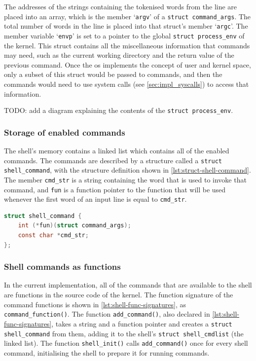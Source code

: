 \documentclass{article}
\begin{document}
The addresses of the strings containing the tokenised words from the line are
placed into an array, which is the member `\texttt{argv}' of a \texttt{struct
command\_args}. The total number of words in the line is placed into that
struct's member `\texttt{argc}'. The member variable `\texttt{envp}' is set to
a pointer to the global \texttt{struct process\_env} of the kernel. This struct
contains all the miscellaneous information that commands may need, such as the
current working directory and the return value of the previous command. Once
the \gls{os} implements the concept of user and kernel space, only a subset of
this struct would be passed to commands, and then the commands would need to
use system calls (see \autoref{sec:impl_syscalls}) to access that information.

TODO: add a diagram explaining the contents of the \texttt{struct
process\_env}.

\subsubsection{Storage of enabled commands}
The shell's memory contains a linked list which contains all of the enabled
commands. The commands are described by a structure called a \texttt{struct
shell\_command}, with the structure definition shown in
\autoref{lst:struct-shell-command}. The member \verb!cmd_str! is a string
containing the word that is used to invoke that command, and \verb!fun! is a
function pointer to the function that will be used whenever the first word of
an input line is equal to \verb!cmd_str!.

\begin{lstlisting}[language=C,
                   caption={The definition of the \texttt{shell\_command}
                   struct},
                   label={lst:struct-shell-command}]
struct shell_command {
    int (*fun)(struct command_args);
    const char *cmd_str;
};
\end{lstlisting}

\subsubsection{Shell commands as functions}
In the current implementation, all of the commands that are available to the
shell are functions in the source code of the kernel. The function signature of
the command functions is shown in \autoref{lst:shell-func-signatures}, as
\verb!command_function()!. The function \verb!add_command()!, also declared in
\autoref{lst:shell-func-signatures}, takes a string and a function pointer and
creates a \verb!struct shell_command! from them, adding it to the shell's
\verb!struct shell_cmdlist! (the linked list). The function \verb!shell_init()!
calls \verb!add_command()! once for every shell command, initialising the shell
to prepare it for running commands.
\end{document}
